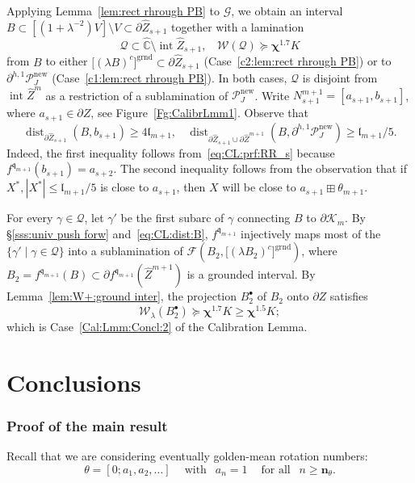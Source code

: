 \documentclass{amsart}
\renewcommand{\sp}{{\ \ }}
\newcommand{\1}{{\mathbb 1 }}
\newcommand{\FamG}{{\mathcal G}}
\newcommand{\FamQ}{{\mathcal Q}}
\newcommand{\Fam}{{\mathcal F}}
\newcommand{\Width}{{\mathcal W}}
\newcommand\intr{\operatorname{int}}
\newcommand{\wZ}{{\widehat Z}}
\newcommand{\bbn}{{\mathbf n}}
\newcommand{\qq}{\mathfrak{q}}
\newcommand{\length}{{\mathfrak l}}
\newcommand\PP{\mathcal{P}}
\newcommand{\grnd}{{\operatorname{grnd}}}
\newcommand\new{{\operatorname{new}}}
\newcommand{\wC}{\widehat{\mathbb{C}}}
\theoremstyle{remark}
\numberwithin{equation}{section}
\theoremstyle{definition}
\newcommand{\filled}{{\mathcal {K} }}
\newcommand{\dist}{\operatorname{dist}}
\newcommand{\bchi}{{\boldsymbol{ \chi}}}
\begin{document}
 Applying Lemma~\ref{lem:rect rhrough PB} to $\FamG$, we obtain an interval $B\subset [(1+\lambda^{-2})V]\setminus V\subset \partial \wZ_{s+1}$ together with a lamination \[\FamQ\subset  \wC\setminus \intr \wZ_{s+1},\sp\sp\Width(\FamQ)\succeq \bchi^{1.7} K \] from $B$ to either $\big [ (\lambda B)^c\big]^\grnd\subset \partial \wZ_{s+1}$ (Case~\ref{c2:lem:rect rhrough PB}) or to $\partial ^{h,1}\PP^\new_J$ (Case~\ref{c1:lem:rect rhrough PB}). In both cases, $\FamQ$ is disjoint from $\intr \wZ^m$ as a restriction of a sublamination of $\PP^\new_J$. Write $N_{s+1}^{m+1}=[a_{s+1},b_{s+1}]$, where $a_{s+1}\in \partial Z$, see Figure~\ref{Fg:CalibrLmm1}. Observe that 
\begin{equation}
 \label{eq:CL:dist:B}
\dist_{\partial \wZ_{s+1}}(B, b_{s+1})\ge 4\length_{m+1}, \sp\sp \dist_{\partial \wZ_{s+1}\cup \partial \wZ^{m+1}}(B, \partial^{h,1}\PP^\new_J)\ge \length_{m+1}/5. 
\end{equation}
 Indeed, the first inequality follows from~\eqref{eq:CL:prf:RR_s} because $f^{\qq_{m+1}}(b_{s+1})=a_{s+2}$. The second inequality follows from the observation that if $X^*, |X^*|\le \length_{m+1}/5$ is close to $a_{s+1}$, then $X$ will be close to $a_{s+1}\boxplus \theta_{m+1}$.
 
 For every $\gamma\in \FamQ$, let $\gamma'$ be the first subarc of $\gamma$ connecting $B$ to $\partial \filled_m$. By \S\ref{sss:univ push forw} and~\eqref{eq:CL:dist:B}, $f^{\qq_{m+1}}$ injectively maps most of the $\{\gamma'\mid \gamma\in \FamQ\}$ into a sublamination of $\Fam\left(B_2, \big[(\lambda B_2)^c\big]^\grnd\right)$, where $B_2=f^{\qq_{m+1}}(B)\subset \partial f^{\qq_{m+1}}(\wZ^{m+1})$ is a grounded interval. By Lemma~\ref{lem:W+:ground inter}, the projection $B_2^\bullet$ of $B_2$ onto $\partial Z$ satisfies 
 \[ \Width_{\lambda}(B^\bullet_2)\succeq \bchi^{1.7} K \ge \bchi^{1.5} K;\]
 which is Case~\ref{Cal:Lmm:Concl:2} of the Calibration Lemma.
 


\part{Conclusions}
\label{part:conclus}

\section{Proof of the main result}
\label{s:MainThms}
Recall that we are considering eventually golden-mean rotation numbers:
\begin{equation}
\label{eq:cond on theta}
\theta=[0;a_1,a_2,\dots]\sp\sp \text{ with }\sp a_n=1\sp\sp\text{ for all }\sp n\ge \bbn_\theta.
\end{equation}
\end{document}
